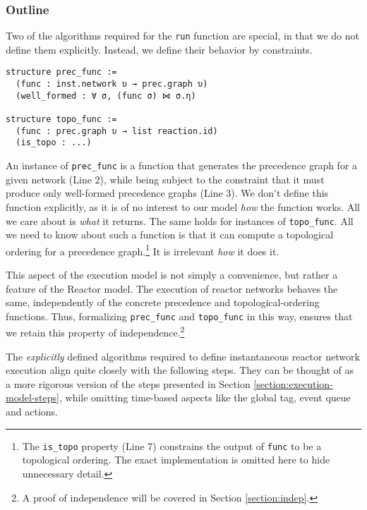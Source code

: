 \subsubsection{Outline}

Two of the algorithms required for the \lstinline{run} function are special, in that we do not define them explicitly.
Instead, we define their behavior by constraints.

\lstset{numbers=left, xleftmargin=1.5em}
\begin{lstlisting}
structure prec_func :=
  (func : inst.network υ → prec.graph υ)
  (well_formed : ∀ σ, (func σ) ⋈ σ.η)

structure topo_func :=
  (func : prec.graph υ → list reaction.id)
  (is_topo : ...)
\end{lstlisting}
\lstset{numbers=none, xleftmargin=0em}

\noindent An instance of \lstinline{prec_func} is a function that generates the precedence graph for a given network (Line 2), while being subject to the constraint that it must produce only well-formed precedence graphs (Line 3).
We don't define this function explicitly, as it is of no interest to our model \emph{how} the function works.
All we care about is \emph{what} it returns.
The same holds for instances of \lstinline{topo_func}.
All we need to know about such a function is that it can compute a topological ordering for a precedence graph.\footnote{
  The \lstinline{is_topo} property (Line 7) constrains the output of \lstinline{func} to be a topological ordering.
  The exact implementation is omitted here to hide unnecessary detail. 
}
It is irrelevant \emph{how} it does it.

This aspect of the execution model is not simply a convenience, but rather a feature of the Reactor model.
The execution of reactor networks behaves the same, independently of the concrete precedence and topological-ordering functions.
Thus, formalizing \lstinline{prec_func} and \lstinline{topo_func} in this way, ensures that we retain this property of independence.\footnote{
  A proof of independence will be covered in Section \ref{section:indep}.
}

\vspace{3mm}

\noindent The \emph{explicitly} defined algorithms required to define instantaneous reactor network execution align quite closely with the following steps.
They can be thought of as a more rigorous version of the steps presented in Section \ref{section:execution-model-steps}, while omitting time-based aspects like the global tag, event queue and actions.

